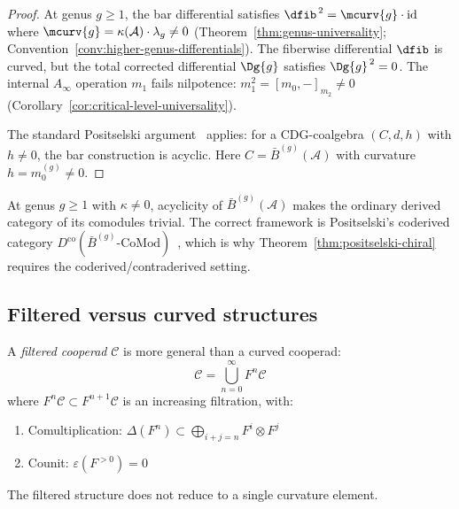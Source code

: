 \begin{proof}
At genus $g \geq 1$, the bar differential satisfies
$\dfib^{\,2} = \mcurv{g} \cdot \mathrm{id}$ where $\mcurv{g} = \kappa(\mathcal{A}) \cdot \lambda_g \neq 0$
(Theorem~\ref{thm:genus-universality}; Convention~\ref{conv:higher-genus-differentials}).  The fiberwise differential $\dfib$ is curved, but the total corrected differential $\Dg{g}$ satisfies
$\Dg{g}^{\,2} = 0$.  The internal $A_\infty$ operation
$m_1$ fails nilpotence: $m_1^2 = [m_0, -]_{m_2} \neq 0$
(Corollary~\ref{cor:critical-level-universality}).

The standard Positselski argument~\cite[Remark~3.6]{Positselski11} applies: for a CDG-coalgebra $(C, d, h)$ with $h \neq 0$, the bar construction is acyclic.  Here $C = \bar{B}^{(g)}(\mathcal{A})$ with curvature $h = m_0^{(g)} \neq 0$.
\end{proof}

\begin{remark}
\label{rem:positselski-acyclicity}
At genus $g \geq 1$ with $\kappa \neq 0$, acyclicity of
$\bar{B}^{(g)}(\mathcal{A})$ makes the ordinary derived category of
its comodules trivial.  The correct framework is Positselski's
coderived category
$D^{\mathrm{co}}(\bar{B}^{(g)}\text{-}\mathrm{CoMod})$~\cite[\S\S3--4]{Positselski11},
which is why Theorem~\ref{thm:positselski-chiral} requires the
coderived/contraderived setting.
\end{remark}

\subsection{Filtered versus curved structures}
\label{sec:filtered-vs-curved}

\begin{theorem}
\label{thm:filtered-cooperads}
A \emph{filtered cooperad} $\mathcal{C}$ is more general than a curved cooperad:
\begin{equation}
\mathcal{C} = \bigcup_{n=0}^\infty F^n \mathcal{C}
\end{equation}
where $F^n \mathcal{C} \subset F^{n+1} \mathcal{C}$ is an increasing filtration, with:
\begin{enumerate}
\item Comultiplication: $\Delta(F^n) \subset \bigoplus_{i+j=n} F^i \otimes F^j$
\item Counit: $\varepsilon(F^{>0}) = 0$
\end{enumerate}

The filtered structure does not reduce to a single curvature element.
\end{theorem}

